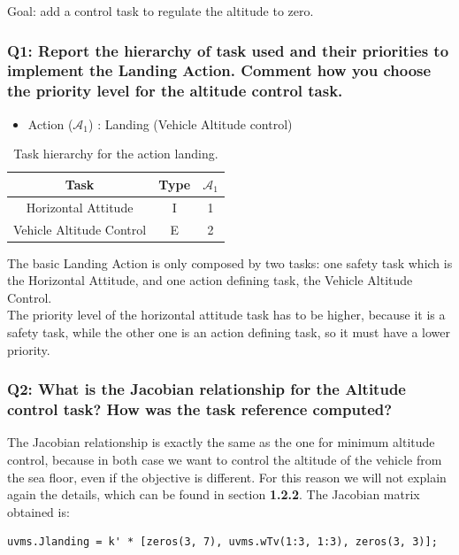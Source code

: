 \documentclass{article}
\begin{document}
Goal: add a control task to regulate the altitude to zero.

\subsubsection{Q1: Report the hierarchy of task used and their priorities to implement the Landing Action. Comment how you choose the priority level for the altitude control task.}

\begin{table}[htb]
	\caption{Task hierarchy for the action landing.}
	\begin{itemize}
		\item Action ($\mathcal{A}_{1}$) : Landing (Vehicle Altitude control)
	\end{itemize}
	\label{tb_align:actions_table_2_1}
	\begin{center}
		\footnotesize
		\begin{tabular}{ccc}
			\toprule
			Task & Type & $\mathcal{A}_{1}$ \\
			\midrule
			Horizontal Attitude             & I & 1 \\
			\hdashline
			Vehicle Altitude Control        & E & 2 \\
			\bottomrule
		\end{tabular}
	\end{center}
\end{table}
The basic Landing Action is only composed by two tasks: one safety task which is the Horizontal Attitude, and one action defining task, the Vehicle Altitude Control.\\
The priority level of the horizontal attitude task has to be higher, because it is a safety task, while the other one is an action defining task, so it must have a lower priority.

\subsubsection{Q2: What is the Jacobian relationship for the Altitude control task? How was the task reference computed?}
The Jacobian relationship is exactly the same as the one for minimum altitude control, because in both case we want to control the altitude of the vehicle from the sea floor, even if the objective is different. For this reason we will not explain again the details, which can be found in section \textbf{1.2.2}.
The Jacobian matrix obtained is:
\begin{lstlisting}
uvms.Jlanding = k' * [zeros(3, 7), uvms.wTv(1:3, 1:3), zeros(3, 3)];
\end{lstlisting}
\end{document}
